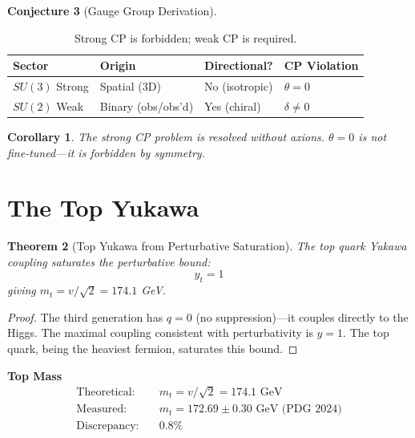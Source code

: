 \documentclass[11pt,a4paper]{article}
\theoremstyle{plain}
\newtheorem{theorem}{Theorem}[section]
\newtheorem{corollary}[theorem]{Corollary}
\theoremstyle{definition}
\newtheorem{conjecture}[theorem]{Conjecture}
\theoremstyle{remark}
\begin{document}
\begin{conjecture}[Gauge Group Derivation]
\begin{table}[H]
\centering
\begin{tabular}{@{}llll@{}}
\toprule
\textbf{Sector} & \textbf{Origin} & \textbf{Directional?} & \textbf{CP Violation} \\
\midrule
$SU(3)$ Strong & Spatial (3D) & No (isotropic) & $\theta = 0$ \\
$SU(2)$ Weak & Binary (obs/obs'd) & Yes (chiral) & $\delta \neq 0$ \\
\bottomrule
\end{tabular}
\caption{Strong CP is forbidden; weak CP is required.}
\end{table}

\begin{corollary}
The strong CP problem is resolved without axions. $\theta = 0$ is not fine-tuned---it is forbidden by symmetry.
\end{corollary}

\section{The Top Yukawa}

\begin{theorem}[Top Yukawa from Perturbative Saturation]
The top quark Yukawa coupling saturates the perturbative bound:
\begin{equation}
\boxed{y_t = 1}
\end{equation}
giving $m_t = v/\sqrt{2} = 174.1$ GeV.
\end{theorem}

\begin{proof}
The third generation has $q = 0$ (no suppression)---it couples directly to the Higgs. The maximal coupling consistent with perturbativity is $y = 1$. The top quark, being the heaviest fermion, saturates this bound.
\end{proof}

\begin{derivedconstant}
\textbf{Top Mass}
\begin{align*}
\text{Theoretical:} \quad & m_t = v/\sqrt{2} = 174.1 \text{ GeV} \\
\text{Measured:} \quad & m_t = 172.69 \pm 0.30 \text{ GeV (PDG 2024)} \\
\text{Discrepancy:} \quad & \mathbf{0.8\%}
\end{align*}
\end{derivedconstant}


\end{conjecture}
\end{document}

